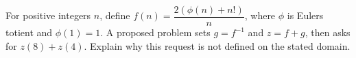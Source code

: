 For positive integers $n$, define $f(n)=\dfrac{2(\phi(n)+n!)}{n}$, where $\phi$ is Euler\textquotesingle s totient and $\phi(1)=1$. A proposed problem sets $g=f^{-1}$ and $z=f+g$, then asks for $z(8)+z(4)$. Explain why this request is not defined on the stated domain.
